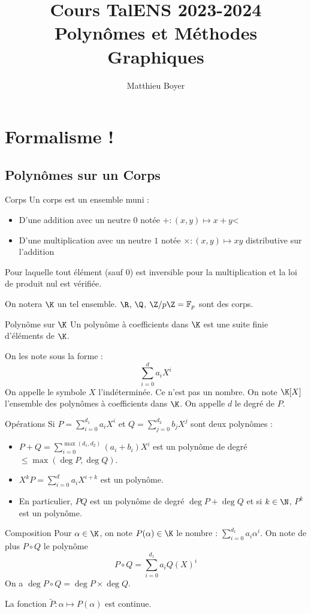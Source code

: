 \documentclass{cours}
\title{Cours TalENS 2023-2024\\
\small Polynômes et Méthodes Graphiques}
\author{Matthieu Boyer}
\begin{document}
\section{Formalisme !}
\subsection{Polynômes sur un Corps}
\begin{définition}{Corps}{}
Un corps est un ensemble muni :
\begin{itemize}
    \item D'une addition avec un neutre $0$ notée $+ : (x, y) \mapsto x + y$<
    \item D'une multiplication avec un neutre $1$ notée $\times : (x, y) \mapsto xy$ distributive sur l'addition
\end{itemize}
Pour laquelle tout élément (sauf $0$) est inversible pour la multiplication et la loi de produit nul est vérifiée.
\end{définition}
On notera $\K$ un tel ensemble. $\R$, $\Q$, $\Z/p\Z = \mathbb{F}_{p}$ sont des corps.

\begin{définition}{Polynôme sur $\K$}{}
Un polynôme à coefficients dans $\K$ est une suite finie d'éléments de $\K$.
\end{définition}
On les note sous la forme :
\[
    \sum_{i = 0}^{d} a_{i}X^{i}
\]
On appelle le symbole $X$ l'indéterminée. Ce n'est pas un nombre. On note $\K[X]$ l'ensemble des polynômes à coefficients dans $\K$. On appelle $d$ le degré de $P$.
\begin{propositionfr}{Opérations}{}
    Si $P = \sum_{i = 0}^{d_{1}} a_{i}X^{i}$ et $Q = \sum_{j = 0}^{d_{2}} b_{j}X^{j}$ sont deux polynômes :
    \vspace{-12pt}
    \begin{itemize}
        \item $P + Q = \sum_{i = 0}^{\max(d_{1}, d_{2})} (a_{i} + b_{i})X^{i}$ est un polynôme de degré $\leq \max(\deg P, \deg Q)$.
        \item $X^{k}P = \sum_{i = 0}^{d}a_{i}X^{i + k}$ est un polynôme.
        \item En particulier, $PQ$ est un polynôme de degré $\deg P + \deg Q$ et si $k \in \N$, $P^{k}$ est un polynôme.
    \end{itemize}
\end{propositionfr}
\begin{définition}{Composition}{}
Pour $\alpha \in \K$, on note $P(\alpha) \in \K$ le nombre : $\sum_{i = 0}^{d_{1}}a_{i}\alpha^{i}$. On note de plus $P \circ Q$ le polynôme
\[
    P \circ Q = \sum_{i = 0}^{d_{1}} a_{i}Q(X)^{i}
\]
On a $\deg P\circ Q = \deg P \times \deg Q$.
\end{définition}
La fonction $\tilde{P} : \alpha \mapsto P(\alpha)$ est continue.
\end{document}
